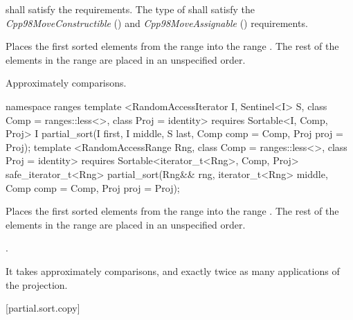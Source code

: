 \begin{itemdescr}
\pnum
\requires
{} shall satisfy the
 requirements. The type
of  shall satisfy the
\textit{Cpp98MoveConstructible} () and
\textit{Cpp98MoveAssignable} () requirements.

\pnum
\effects
Places the first
sorted elements from the range
into the range
.
The rest of the elements in the range
are placed in an unspecified order.
%

\pnum
\complexity
Approximately
comparisons.
\end{itemdescr}

\begin{addedblock}
%
\begin{itemdecl}
namespace ranges {
  template <RandomAccessIterator I, Sentinel<I> S, class Comp = ranges::less<>,
            class Proj = identity>
      requires Sortable<I, Comp, Proj>
    I partial_sort(I first, I middle, S last, Comp comp = Comp{}, Proj proj = Proj{});
  template <RandomAccessRange Rng, class Comp = ranges::less<>, class Proj = identity>
      requires Sortable<iterator_t<Rng>, Comp, Proj>
    safe_iterator_t<Rng> partial_sort(Rng&& rng, iterator_t<Rng> middle, Comp comp = Comp{},
                                      Proj proj = Proj{});
}
\end{itemdecl}

\begin{itemdescr}
\pnum
\effects
Places the first
sorted elements from the range
into the range
.
The rest of the elements in the range
are placed in an unspecified order.
%

\pnum
\returns {}.

\pnum
\complexity
It takes approximately
comparisons, and exactly twice as many applications of the projection.
\end{itemdescr}
\end{addedblock}

[partial.sort.copy]{}

